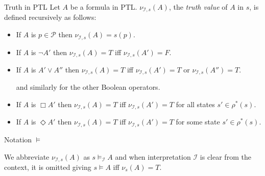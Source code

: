 \documentclass[style=simple,size=12pt]{powerdot}
\begin{document}
\begin{wideslide}[bm=,toc=]{Truth in PTL}
Let $A$ be a formula in PTL.
$\nu_{\mathcal{I},s}(A)$, the {\em truth value\/} of $A$ in $s$, is defined recursively as follows:
\begin{itemize}
\item If $A$ is $p\in\mathcal{P}$ then $\nu_{\mathcal{I},s}(A) = s(p)$.
\item If $A$ is $\neg A'$ then $\nu_{\mathcal{I},s}(A) = T$ iff $\nu_{\mathcal{I},s}(A') = F$.
\item If $A$ is $A'\vee A''$ then $\nu_{\mathcal{I},s}(A) = T$ iff $\nu_{\mathcal{I},s}(A') = T$ or
$\nu_{\mathcal{I},s}(A'') = T$.

and similarly for the other Boolean operators.

\item If $A$ is $\Box A'$ then $\nu_{\mathcal{I},s}(A) = T$ iff $\nu_{\mathcal{I},s}(A') = T$ for
all states $s'\in\rho^*(s)$.

\item If $A$ is $\Diamond A'$ then $\nu_{\mathcal{I},s}(A) = T$ iff $\nu_{\mathcal{I},s}(A') = T$ for
some state $s'\in\rho^*(s)$.

\end{itemize}
\end{wideslide}

\begin{wideslide}[bm=,toc=]{Notation $\models$}

We abbreviate $\nu_{\mathcal{I},s}(A)$ as $s\models_\mathcal{I} A$ and when interpretation $\mathcal{I}$
is clear from the context, it is omitted giving $s\models A$ iff $\nu_s(A) = T$.
\end{wideslide}
\end{document}
